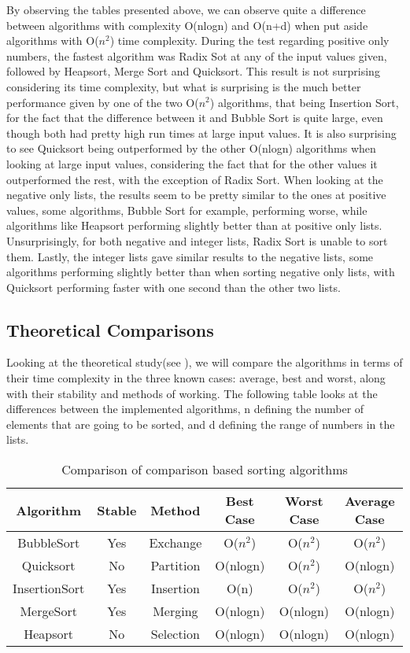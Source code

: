 \documentclass{article}
\numberwithin{figure}{section}
\begin{document}
By observing the tables presented above, we can observe quite a difference between algorithms with complexity O(nlogn) and O(n+d) when put aside algorithms with O(\(n^2\)) time complexity. During the test regarding positive only numbers, the fastest algorithm was Radix Sot at any of the input values given, followed by Heapsort, Merge Sort and Quicksort. This result is not surprising considering its time complexity, but what is surprising is the much better performance given by one of the two O(\(n^2\)) algorithms, that being Insertion Sort, for the fact that the difference between it and Bubble Sort is quite large, even though both had pretty high run times at large input values. It is also surprising to see Quicksort being outperformed by the other O(nlogn) algorithms when looking at large input values, considering the fact that for the other values it outperformed the rest, with the exception of Radix Sort. When looking at the negative only lists, the results seem to be pretty similar to the ones at positive values, some algorithms, Bubble Sort for example, performing worse, while algorithms like Heapsort performing slightly better than at positive only lists. Unsurprisingly, for both negative and integer lists, Radix Sort is unable to sort them. Lastly, the integer lists gave similar results to the negative lists, some algorithms performing slightly better than when sorting negative only lists, with Quicksort performing faster with one second than the other two lists.

\subsection{Theoretical Comparisons}

Looking at the theoretical study(see \cite{Thomas}\cite{Kurt}\cite{Adam}), we will compare the algorithms in terms of their time complexity in the three known cases: average, best and worst, along with their stability and methods of working. The following table looks at the differences between the implemented algorithms, n defining the number of elements that are going to be sorted, and d defining the range of numbers in the lists.

\begin{table}[h!]
\begin{center}
\begin{tabular}{|c|c|c|c|c|c|} 
\hline
Algorithm & Stable & Method & Best Case & Worst Case & Average Case \\
\hline
BubbleSort & Yes & Exchange & O(\(n^2\)) & O(\(n^2\)) & O(\(n^2\)) \\ 
Quicksort & No & Partition & O(nlogn) & O(\(n^2\)) & O(nlogn) \\ 
InsertionSort & Yes & Insertion & O(n) & O(\(n^2\)) & O(\(n^2\)) \\ 
MergeSort & Yes & Merging & O(nlogn) & O(nlogn) & O(nlogn) \\ 
Heapsort & No & Selection & O(nlogn) & O(nlogn) & O(nlogn) \\ 
\hline
\end{tabular}
\end{center}
\caption{Comparison of comparison based sorting algorithms}
\end{table}
\end{document}
